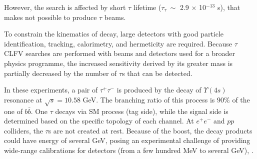 However, the search is affected by   
short $\tau$ lifetime  
($\tau_\tau \ \sim$ 2.9 $\times$ 10$^{-13}$ s), that 
makes not possible to produce 
$\tau$ beams.

To constrain the kinematics of decay, 
large detectors with good particle 
identification, tracking, calorimetry, 
and hermeticity are required. 
Because $\tau$ CLFV searches are performed  
with beams and detectors used for a 
broader physics programme, 
the increased sensitivity derived by 
its greater mass is partially decreased 
by the number of $\tau$s that can be detected.

In these experiments, a pair of 
$\tau^+ \tau^-$ is produced by the 
decay of $\Upsilon(4s)$ resonance at 
$\sqrt{s}=10.58$ GeV. The branching ratio 
of this process is  $90\%$ of 
the one of $b \bar{b}$. One $\tau$ decays 
via SM process (tag side), 
while the signal side is determined based on 
the specific topology of each channel. 
At $e^+ e^-$ and $pp$ colliders, the $\tau$s 
are not created at rest. Because of the boost, 
the decay products could have 
energy of several GeV, posing an experimental 
challenge of providing wide-range calibrations 
for detectors (from a few hundred MeV to several GeV), 
\cite{universe8060299}.

